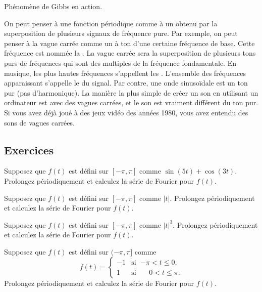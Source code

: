 \begin{myfig}
\capstart
{}
\caption{Phénomène de Gibbs en action.\label{ts:squarewavegibbsfig}}
\end{myfig}

On peut penser à une fonction périodique comme à un  obtenu par la superposition de plusieurs signaux de fréquence pure. Par exemple, on peut penser à la vague carrée comme un à ton d'une certaine fréquence de base. Cette fréquence est nommée la 
\emph{}.
La vague carrée sera la superposition de plusieurs tons purs de fréquences qui sont des multiples de la fréquence fondamentale. En musique, les plus hautes fréquences s'appellent les \emph{}.
L'ensemble des fréquences apparaissant s'appelle le 
\emph{} du signal. Par contre, une onde sinusoïdale est un ton pur (pas d'harmonique). La manière la plus simple de créer un son en utilisant un ordinateur est avec des vagues carrées, et le son est vraiment différent du ton pur. Si vous avez déjà joué à des jeux vidéo des années 1980, vous avez entendu des sons de vagues carrées. 


\subsection{Exercices}

\begin{exercise}
Supposez que $f(t)$ est défini sur $[-\pi,\pi]$ comme $\sin (5t) + \cos (3t)$.  Prolongez périodiquement et calculez la série de Fourier pour $f(t)$.
\end{exercise}

\begin{exercise}
Supposez que $f(t)$ est défini sur $[-\pi,\pi]$ comme $\lvert t \rvert$.
  Prolongez périodiquement et calculez la série de Fourier pour $f(t)$.
\end{exercise}

\begin{exercise}
Supposez que $f(t)$ est défini sur $[-\pi,\pi]$ comme $\lvert t \rvert^3$.
Prolongez périodiquement et calculez la série de Fourier pour $f(t)$.
\end{exercise}

\begin{exercise}
Supposez que $f(t)$ est défini sur $(-\pi,\pi]$ comme
\begin{equation*}
f(t) =
\begin{cases}
-1 & \text{si } \; {-\pi} < t \leq 0 , \\
1 & \text{si } \; \phantom{-}0 < t \leq \pi .
\end{cases}
\end{equation*}
Prolongez périodiquement et calculez la série de Fourier pour $f(t)$.
\end{exercise}

